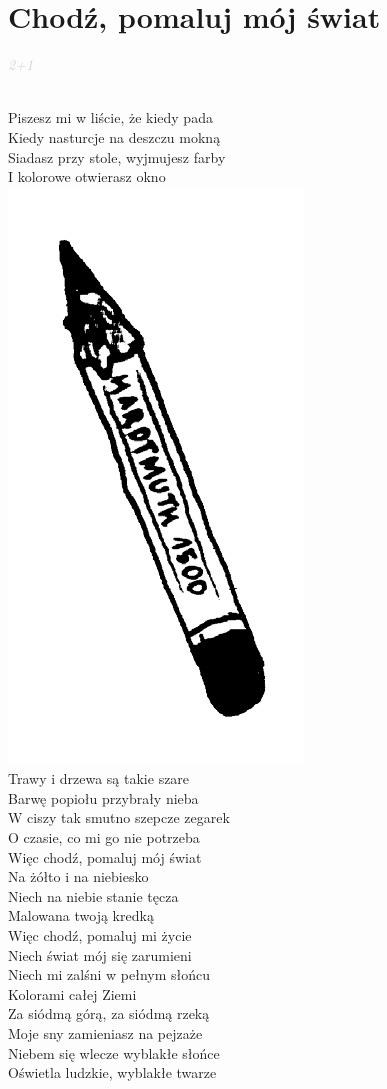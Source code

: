 \documentclass[a5paper, 10pt]{book}
\begin{document}
\section{Chodź, pomaluj mój świat}\textcolor{lightgray}{\textit{2+1}}\\~\\
\begin{minipage}[t]{0.6\textwidth}
  Piszesz mi w liście, że kiedy pada\\
  Kiedy nasturcje na deszczu mokną\\
  Siadasz przy stole, wyjmujesz farby\\
  I kolorowe otwierasz okno\\
  \hspace*{0.75\textwidth}\includegraphics[height=0.3\textwidth]{images/chodz_pomaluj_moj_swiat.png}\vspace*{-0.305\textwidth}~~\\

Trawy i drzewa są takie szare\\
Barwę popiołu przybrały nieba\\
W ciszy tak smutno szepcze zegarek\\
O czasie, co mi go nie potrzeba\\

\hspace*{4mm} Więc chodź, pomaluj mój świat\\
\hspace*{4mm} Na żółto i na niebiesko\\
\hspace*{4mm} Niech na niebie stanie tęcza\\
\hspace*{4mm} Malowana twoją kredką\\
\hspace*{4mm} Więc chodź, pomaluj mi życie\\
\hspace*{4mm} Niech świat mój się zarumieni\\
\hspace*{4mm} Niech mi zalśni w pełnym słońcu\\
\hspace*{4mm} Kolorami całej Ziemi\\

Za siódmą górą, za siódmą rzeką\\
Moje sny zamieniasz na pejzaże\\
Niebem się wlecze wyblakłe słońce\\
Oświetla ludzkie, wyblakłe twarze\\

\end{minipage}
\end{document}

